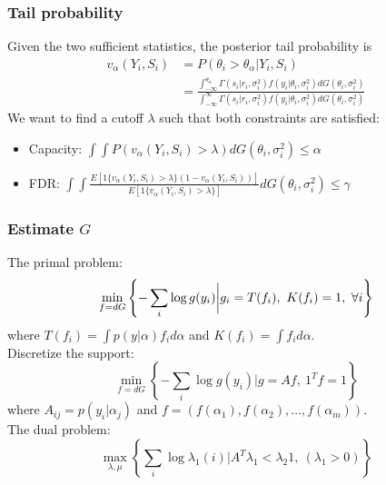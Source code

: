 \documentclass[10pt,mathserif]{beamer}
\begin{document}
\begin{frame}
  \frametitle{Tail probability}
  Given the two sufficient statistics, the posterior tail probability is
  \begin{align*}
    v_\alpha(Y_i,S_i) & = P( \theta_i > \theta_{\alpha} | Y_i,S_i)                                                                                 \\
                      & = \frac{{\int_{-\infty}^{\theta_{\alpha}} \Gamma(s_i|r_i,\sigma_i^2) f(y_i|\theta_i, \sigma_i^2) dG(\theta_i,\sigma_i^2)}}
    {{\int_{-\infty}^{\infty} \Gamma(s_i|r_i,\sigma_i^2) f(y_i|\theta_i, \sigma_i^2) dG(\theta_i,\sigma_i^2)}}
  \end{align*}
  We want to find a cutoff $\lambda$ such that both constraints are satisfied:

  \begin{itemize}\itemsep=8pt
    \item Capacity: $\int \int P(v_\alpha(Y_i, S_i) > \lambda) dG(\theta_i,\sigma_i^2)
            \leq \alpha$
    \item FDR: $\int \int
            \frac{E[1\{v_\alpha(Y_i,S_i)>\lambda\}(1-v_\alpha(Y_i,S_i))]}{E[1\{v_\alpha(Y_i,S_i)>\lambda\}]}
            dG(\theta_i,\sigma_i^2) \leq \gamma$
  \end{itemize}
\end{frame}

\begin{frame}
  \frametitle{Estimate $G$}
  The primal problem:
  \begin{equation*}
    \min_{f=dG}\left\{-\sum_i \log g(y_i)\bigg |g_i = T(f_i),\ K(f_i)=1,\ \forall i \right\}
  \end{equation*}
  where $ T(f_i)=\int p(y |\alpha)f_id\alpha $ and  $K(f_i)= \int f_i d\alpha$.\\
  Discretize the support:
  \begin{equation*}
    \min_{f=dG}\left\{-\sum_i \log g(y_i)\bigg |g=Af,\ {1^T}f=1\right\}
  \end{equation*}
  where $A_{ij}= p(y_i|\alpha_j) $ and $ f = (f(\alpha_1),f(\alpha_2),\ldots,f(\alpha_m))$.\\
  The dual problem:
  \begin{equation*}
    \max_{\lambda,\mu} \left\{ \sum_i \log \lambda_1(i) \bigg| A^T\lambda_1 < \lambda_2 1,\ (\lambda_1>0) \right\}
  \end{equation*}
\end{frame}
\end{document}
